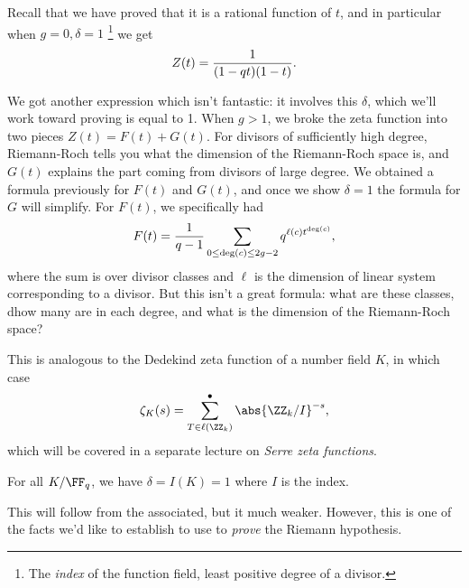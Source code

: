 \begin{remark}

Recall that we have proved that it is a rational function of \(t\), and
in particular when \(g=0, \delta = 1\) \footnote{The \emph{index} of the
  function field, least positive degree of a divisor.} we get
\begin{align*}  
Z(t) = {1 \over (1-qt)(1-t)}
.\end{align*}

We got another expression which isn't fantastic: it involves this
\(\delta\), which we'll work toward proving is equal to 1. When \(g>1\),
we broke the zeta function into two pieces \(Z(t) = F(t) + G(t)\). For
divisors of sufficiently high degree, Riemann-Roch tells you what the
dimension of the Riemann-Roch space is, and \(G(t)\) explains the part
coming from divisors of large degree. We obtained a formula previously
for \(F(t)\) and \(G(t)\), and once we show \(\delta=1\) the formula for
\(G\) will simplify. For \(F(t)\), we specifically had
\begin{align*}  
F(t) = {1\over q-1} \sum_{0\leq \deg(c) \leq 2g-2} q^{\ell(c) t^{\deg(c)}}
,\end{align*} where the sum is over divisor classes and \(\ell\) is the
dimension of linear system corresponding to a divisor. But this isn't a
great formula: what are these classes, dhow many are in each degree, and
what is the dimension of the Riemann-Roch space?

\end{remark}

\begin{remark}

This is analogous to the Dedekind zeta function of a number field \(K\),
in which case
\begin{align*}  
\zeta_K(s) = \sum_{T\in \ell(\ZZ_k)}^\bullet \abs{\ZZ_k/I}^{-s}
,\end{align*} which will be covered in a separate lecture on \emph{Serre
zeta functions}.

\end{remark}

\begin{theorem}[F.K. Schmidt]

For all \(K/\FF_q\), we have \(\delta = I(K) = 1\) where \(I\) is the
index.

\end{theorem}

This will follow from the associated, but it much weaker. However, this
is one of the facts we'd like to establish to use to \emph{prove} the
Riemann hypothesis.

